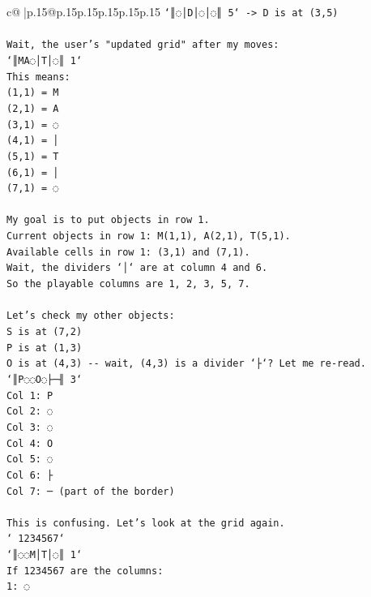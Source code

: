 \documentclass{article}
\begin{document}
{\begin{supertabular}{c@{$\;$}|p{.15\linewidth}@{}p{.15\linewidth}p{.15\linewidth}p{.15\linewidth}p{.15\linewidth}p{.15\linewidth}}
{{{\texttt{`║◌│D│◌│◌║ 5` {-}> D is at (3,5)} \\
\\ 
\texttt{Wait, the user's "updated grid" after my moves:} \\
\texttt{`║MA◌│T│◌║ 1`} \\
\texttt{This means:} \\
\texttt{(1,1) = M} \\
\texttt{(2,1) = A} \\
\texttt{(3,1) = ◌} \\
\texttt{(4,1) = │} \\
\texttt{(5,1) = T} \\
\texttt{(6,1) = │} \\
\texttt{(7,1) = ◌} \\
\\ 
\texttt{My goal is to put objects in row 1.} \\
\texttt{Current objects in row 1: M(1,1), A(2,1), T(5,1).} \\
\texttt{Available cells in row 1: (3,1) and (7,1).} \\
\texttt{Wait, the dividers `│` are at column 4 and 6.} \\
\texttt{So the playable columns are 1, 2, 3, 5, 7.} \\
\\ 
\texttt{Let's check my other objects:} \\
\texttt{S is at (7,2)} \\
\texttt{P is at (1,3)} \\
\texttt{O is at (4,3) {-}{-} wait, (4,3) is a divider `├`? Let me re{-}read.} \\
\texttt{`║P◌◌O◌├─╢ 3`} \\
\texttt{Col 1: P} \\
\texttt{Col 2: ◌} \\
\texttt{Col 3: ◌} \\
\texttt{Col 4: O} \\
\texttt{Col 5: ◌} \\
\texttt{Col 6: ├} \\
\texttt{Col 7: ─ (part of the border)} \\
\\ 
\texttt{This is confusing. Let's look at the grid again.} \\
\texttt{` 1234567`} \\
\texttt{`║◌◌M│T│◌║ 1`} \\
\texttt{If 1234567 are the columns:} \\
\texttt{1: ◌} \\
}}}
\end{supertabular}}
\end{document}
